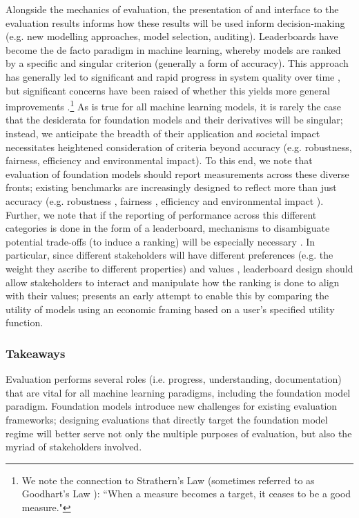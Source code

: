 Alongside the mechanics of evaluation, the presentation of and interface to the evaluation results informs how these results will be used inform decision-making (e.g. new modelling approaches, model selection, auditing). Leaderboards have become the de facto paradigm in machine learning, whereby models are ranked by a specific and singular criterion (generally a form of accuracy). This approach has generally led to significant and rapid progress in system quality over time \citep[e.g. ][]{wang2019superglue}, but significant concerns have been raised of whether this yields more general improvements \citep[e.g. ][]{linzen2020, bowman2021}.\footnote{We note the connection to Strathern's Law \citep{strathern1997} (sometimes referred to as Goodhart's Law \citep{goodhart1984}): ``When a measure becomes a target, it ceases to be a good measure."} As is true for all machine learning models, it is rarely the case that the desiderata for foundation models and their derivatives will be singular; instead, we anticipate the breadth of their application and societal impact necessitates heightened consideration of criteria beyond accuracy (e.g. robustness, fairness, efficiency and environmental impact). To this end, we note that evaluation of foundation models should report measurements across these diverse fronts; existing benchmarks are increasingly designed to reflect more than just accuracy (e.g. robustness \citep{koh2021wilds, goel2021robustnessgym}, fairness \citep{stereoset, nangia2020}, efficiency and environmental impact \citep{coleman2017dawnbench}). Further, we note that if the reporting of performance across this different categories is done in the form of a leaderboard, mechanisms to disambiguate potential trade-offs (to induce a ranking) will be especially necessary \citep{ethayarajh2020}. In particular, since different stakeholders will have different preferences (e.g. the weight they ascribe to different properties) and values \citep{birhane2020}, leaderboard design should allow stakeholders to interact and manipulate how the ranking is done to align with their values; \citet{ma2021} presents an early attempt to enable this by comparing the utility of models using an economic framing based on a user's specified utility function. 

\subsubsection{Takeaways}
\label{sec:evaluation-takeaways}
Evaluation performs several roles (i.e. progress, understanding, documentation) that are vital for all machine learning paradigms, including the foundation model paradigm. Foundation models introduce new challenges for existing evaluation frameworks; designing evaluations that directly target the foundation model regime will better serve not only the multiple purposes of evaluation, but also the myriad of stakeholders involved.

